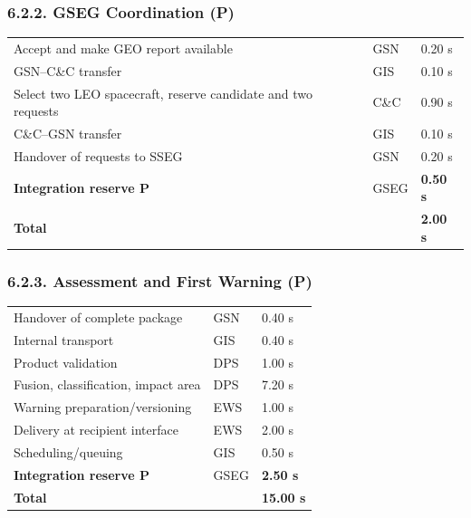 \subsubsection{6.2.2. GSEG Coordination (P)}\label{preliminary-2-s-budget-p}

\begingroup{}
\begin{longtable}{|P{0.61}|P{0.21}|P{0.18}|}
\hline{}
 &  & \\ \hline
\endhead
\hline\endlastfoot
Accept and make GEO report available & GSN & 0.20 s\\ \hline
GSN–C\&C transfer & GIS & 0.10 s\\ \hline
Select two LEO spacecraft, reserve candidate and two requests & C\&C & 0.90 s\\ \hline
C\&C–GSN transfer & GIS & 0.10 s\\ \hline
Handover of requests to SSEG & GSN & 0.20 s\\ \hline
\textbf{Integration reserve P} & GSEG & \textbf{0.50 s}\\ \hline
\textbf{Total} &  & \textbf{2.00 s}\\*
\end{longtable}
\endgroup

\subsubsection{6.2.3. Assessment and First Warning (P)}\label{preliminary-15-s-budget-p}

\begingroup{}
\begin{longtable}{|P{0.61}|P{0.21}|P{0.18}|}
\hline{}
 &  & \\ \hline
\endhead
\hline\endlastfoot
Handover of complete package & GSN & 0.40 s\\ \hline
Internal transport & GIS & 0.40 s\\ \hline
Product validation & DPS & 1.00 s\\ \hline
Fusion, classification, impact area & DPS & 7.20 s\\ \hline
Warning preparation/\allowbreak{}versioning & EWS & 1.00 s\\ \hline
Delivery at recipient interface & EWS & 2.00 s\\ \hline
Scheduling/\allowbreak{}queuing & GIS & 0.50 s\\ \hline
\textbf{Integration reserve P} & GSEG & \textbf{2.50 s}\\ \hline
\textbf{Total} &  & \textbf{15.00 s}\\*
\end{longtable}
\endgroup

